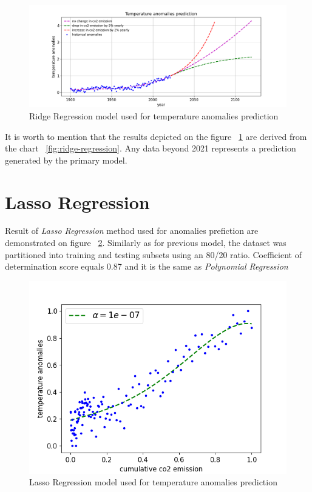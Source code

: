 \begin{figure}[H]
  \includegraphics[width=\linewidth]{img/ridge-regression-result.png}
  \caption{Ridge Regression model used for temperature anomalies prediction}
  \label{fig:ridge-regression-result}
\end{figure}
It is worth to mention that the results depicted on the figure ~\ref{fig:ridge-regression-result} are derived from the chart ~\ref{fig:ridge-regression}. Any data beyond 2021 represents a prediction generated by the primary model.


\clearpage
\section{Lasso Regression}
Result of \textit{Lasso Regression} method used for anomalies prefiction are demonstrated on figure ~\ref{fig:lasso-regression}. 
Similarly as for previous model, the dataset was partitioned into training and testing subsets using an 80/20 ratio. Coefficient of determination score equals 0.87 and it is the same as \textit{Polynomial Regression}
\begin{figure}[h]
  \includegraphics[width=\linewidth]{img/lasso-regression.png}
  \caption{Lasso Regression model used for temperature anomalies prediction}
  \label{fig:lasso-regression}
\end{figure}

